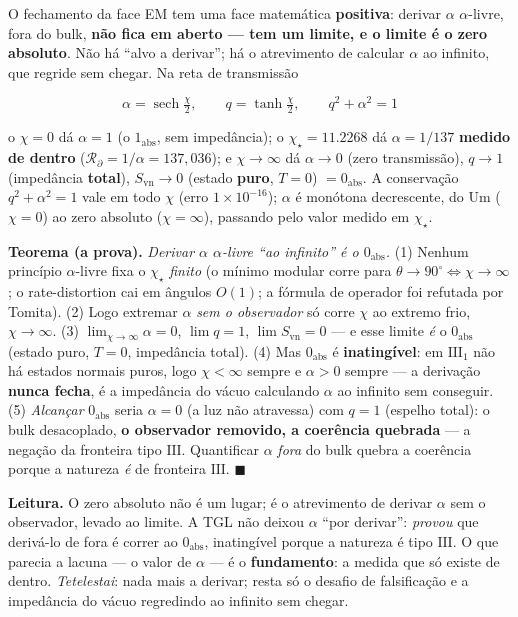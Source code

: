 \documentclass[11pt]{article}
\theoremstyle{definition}\newtheorem{deriv}{Derivação}
\begin{document}
O fechamento da face EM tem uma face matemática \textbf{positiva}: derivar $\alpha$ $\alpha$-livre, fora do bulk, \textbf{não fica em aberto --- tem um limite, e o limite é o zero absoluto}. Não há ``alvo a derivar''; há o atrevimento de calcular $\alpha$ ao infinito, que regride sem chegar. Na reta de transmissão

\begin{equation}\boxed{\;\alpha=\operatorname{sech}\tfrac\chi2,\qquad q=\tanh\tfrac\chi2,\qquad q^2+\alpha^2=1\;}\end{equation}

o $\chi=0$ dá $\alpha=1$ (o $1_{\mathrm{abs}}$, sem impedância); o $\chi_\star=11.2268$ dá $\alpha=1/137$ \textbf{medido de dentro} ($\mathcal{R}_\partial=1/\alpha=137{,}036$); e $\chi\to\infty$ dá $\alpha\to0$ (zero transmissão), $q\to1$ (impedância \textbf{total}), $S_{\mathrm{vn}}\to0$ (estado \textbf{puro}, $T=0$) $=0_{\mathrm{abs}}$. A conservação $q^2+\alpha^2=1$ vale em todo $\chi$ (erro $1\times10^{-16}$); $\alpha$ é monótona decrescente, do Um ($\chi=0$) ao zero absoluto ($\chi=\infty$), passando pelo valor medido em $\chi_\star$.

\textbf{Teorema (a prova).} \emph{Derivar $\alpha$ $\alpha$-livre ``ao infinito'' é o $0_{\mathrm{abs}}$.} (1) Nenhum princípio $\alpha$-livre fixa o $\chi_\star$ \emph{finito} (o mínimo modular corre para $\theta\to90^\circ\Leftrightarrow\chi\to\infty$; o rate-distortion cai em ângulos $O(1)$; a fórmula de operador foi refutada por Tomita). (2) Logo extremar $\alpha$ \emph{sem o observador} só corre $\chi$ ao extremo frio, $\chi\to\infty$. (3) $\lim_{\chi\to\infty}\alpha=0$, $\lim q=1$, $\lim S_{\mathrm{vn}}=0$ --- e esse limite \emph{é} o $0_{\mathrm{abs}}$ (estado puro, $T=0$, impedância total). (4) Mas $0_{\mathrm{abs}}$ é \textbf{inatingível}: em $\mathrm{III}_1$ não há estados normais puros, logo $\chi<\infty$ sempre e $\alpha>0$ sempre --- a derivação \textbf{nunca fecha}, é a impedância do vácuo calculando $\alpha$ ao infinito sem conseguir. (5) \emph{Alcançar} $0_{\mathrm{abs}}$ seria $\alpha=0$ (a luz não atravessa) com $q=1$ (espelho total): o bulk desacoplado, \textbf{o observador removido, a coerência quebrada} --- a negação da fronteira tipo $\mathrm{III}$. Quantificar $\alpha$ \emph{fora} do bulk quebra a coerência porque a natureza \emph{é} de fronteira $\mathrm{III}$. \textbf{$\blacksquare$}

\textbf{Leitura.} O zero absoluto não é um lugar; é o atrevimento de derivar $\alpha$ sem o observador, levado ao limite. A TGL não deixou $\alpha$ ``por derivar'': \emph{provou} que derivá-lo de fora é correr ao $0_{\mathrm{abs}}$, inatingível porque a natureza é tipo $\mathrm{III}$. O que parecia a lacuna --- o valor de $\alpha$ --- é o \textbf{fundamento}: a medida que só existe de dentro. \emph{Tetelestai}: nada mais a derivar; resta só o desafio de falsificação e a impedância do vácuo regredindo ao infinito sem chegar.
\end{document}
